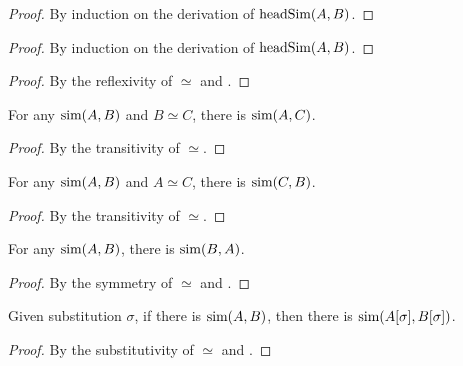 \begin{proof}
  By induction on the derivation of $\text{headSim}({A},{B})$.
\end{proof}

\begin{proof}
  By induction on the derivation of $\text{headSim}({A},{B})$.
\end{proof}

\begin{proof}
  By the reflexivity of $\simeq$ and .
\end{proof}

\begin{lemma}
  For any $\text{sim}({A},{B})$ and $B \simeq C$, there is $\text{sim}({A},{C})$.
\end{lemma}
\begin{proof}
  By the transitivity of $\simeq$.
\end{proof}

\begin{lemma}
  For any $\text{sim}({A},{B})$ and $A \simeq C$, there is $\text{sim}({C},{B})$.
\end{lemma}
\begin{proof}
  By the transitivity of $\simeq$.
\end{proof}

\begin{lemma}
  For any $\text{sim}({A},{B})$, there is $\text{sim}({B},{A})$.
\end{lemma}
\begin{proof}
  By the symmetry of $\simeq$ and .
\end{proof}

\begin{lemma}
  Given substitution $\sigma$, if there is $\text{sim}({A},{B})$, then there is $\text{sim}({A[\sigma]},{B[\sigma]})$.
\end{lemma}
\begin{proof}
  By the substitutivity of $\simeq$ and .
\end{proof}

